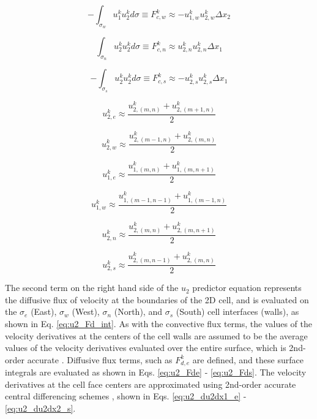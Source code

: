 \documentclass[10pt, letterpaper]{article}
\begin{document}
\begin{equation}
  - \int_{\sigma_{w}}u_{1}^{k}u_{2}^{k}d\sigma \equiv
  F_{c,w}^{k} \approx -u_{1,w}^{k}u_{2,w}^{k}\Delta{x_{2}}
  \label{eq:u2_Fcw}
\end{equation}

\begin{equation}
  \int_{\sigma_{n}}u_{2}^{k}u_{2}^{k}d\sigma \equiv
  F_{c,n}^{k} \approx u_{2,n}^{k}u_{2,n}^{k}\Delta{x_{1}}
  \label{eq:u2_Fcn}
\end{equation}

\begin{equation}
  - \int_{\sigma_{s}}u_{2}^{k}u_{2}^{k}d\sigma \equiv
  F_{c,s}^{k} \approx -u_{2,s}^{k}u_{2,s}^{k}\Delta{x_{1}}
  \label{eq:u2_Fcs}
\end{equation}

\begin{equation}
  u_{2,e}^{k} \approx \frac{u_{2,(m,n)}^{k} + u_{2,(m+1,n)}^{k}}{2}
  \label{eq:u2_u2e}
\end{equation}

\begin{equation}
  u_{2,w}^{k} \approx \frac{u_{2,(m-1,n)}^{k} + u_{2,(m,n)}^{k}}{2}
  \label{eq:u2_u2w}
\end{equation}

\begin{equation}
  u_{1,e}^{k} \approx \frac{u_{1,(m,n)}^{k} + u_{1,(m,n+1)}^{k}}{2}
  \label{eq:u2_u1e}
\end{equation}

\begin{equation}
  u_{1,w}^{k} \approx \frac{u_{1,(m-1,n-1)}^{k} + u_{1,(m-1,n)}^{k}}{2}
  \label{eq:u2_u1w}
\end{equation}

\begin{equation}
  u_{2,n}^{k} \approx \frac{u_{2,(m,n)}^{k} + u_{2,(m,n+1)}^{k}}{2}
  \label{eq:u2_u2n}
\end{equation}

\begin{equation}
  u_{2,s}^{k} \approx \frac{u_{2,(m,n-1)}^{k} + u_{2,(m,n)}^{k}}{2}
  \label{eq:u2_u2s}
\end{equation}

The second term on the right hand side of the $u_{2}$ predictor equation represents the diffusive flux of velocity at the boundaries of the 2D cell, and is evaluated on the $\sigma_{e}$ (East), $\sigma_{w}$ (West), $\sigma_{n}$ (North), and $\sigma_{s}$ (South) cell interfaces (walls), as shown in Eq. \ref{eq:u2_Fd_int}. As with the convective flux terms, the values of the velocity derivatives at the centers of the cell walls are assumed to be the average values of the velocity derivatives evaluated over the entire surface, which is 2nd-order accurate \cite{Ferziger_Springer_2002}. Diffusive flux terms, such as $F_{d,e}^{k}$ are defined, and these surface integrals are evaluated as shown in Eqs. \ref{eq:u2_Fde} - \ref{eq:u2_Fds}. The velocity derivatives at the cell face centers are approximated using 2nd-order accurate central differencing schemes \cite{Ferziger_Springer_2002}, shown in Eqs. \ref{eq:u2_du2dx1_e} - \ref{eq:u2_du2dx2_s}.
\end{document}

